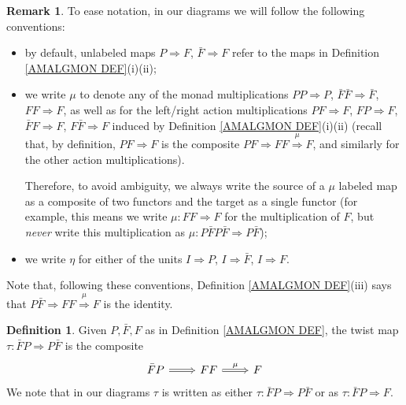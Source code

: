 \documentclass[a4paper,10pt
,draft
]{article}%
\numberwithin{equation}{section}
\numberwithin{figure}{section}
\theoremstyle{definition} %
\newtheorem{definition}[equation]{Definition}%
\newtheorem{remark}[equation]{Remark}%
\newcommand{\1}{\ensuremath{\mathbbm 1}}%
\begin{document}
\begin{remark}\label{SHORTCONV REM}
To ease notation, in our diagrams we will follow the following conventions:
\begin{itemize}
\item by default, unlabeled maps
$P \Rightarrow F$, $\bar{F} \Rightarrow F$ refer to the maps in
Definition \ref{AMALGMON DEF}(i)(ii);
\item we write $\mu$ to denote any of the monad multiplications
$PP \Rightarrow P$,
$\bar{F}\bar{F} \Rightarrow \bar{F}$,
$FF \Rightarrow F$,
as well as for the left/right action multiplications
$PF \Rightarrow F$,
$FP \Rightarrow F$,
$\bar{F} F \Rightarrow F$,
$F \bar{F} \Rightarrow F$
induced by Definition \ref{AMALGMON DEF}(i)(ii)
(recall that, by definition,
$PF \Rightarrow F$ is the composite
$PF \Rightarrow FF \overset{\mu}{\Rightarrow} F$,
and similarly for the other action multiplications).

Therefore, to avoid ambiguity, we always write the 
source of a $\mu$ labeled map as a composite of two functors and the target as a single functor
(for example, this means we write 
$\mu\colon FF \Rightarrow F$ for the multiplication of $F$,
but \emph{never} write this multiplication as $\mu \colon P \bar{F} P \bar{F} \Rightarrow P \bar{F}$);
\item we write $\eta$ for either of the units 
$I \Rightarrow P$,
$I \Rightarrow \bar{F}$,
$I \Rightarrow F$.
\end{itemize}
Note that, following these conventions, 
Definition \ref{AMALGMON DEF}(iii)
says that 
$P\bar{F} \Rightarrow FF \overset{\mu}{\Rightarrow} F$
is the identity.
\end{remark}


\begin{definition}\label{TWISTMAP DEF}
Given $P,\bar{F},F$ as in Definition \ref{AMALGMON DEF}, 
the twist map $\tau \colon \bar{F} P \Rightarrow P \bar{F}$ is the composite
\[
\begin{tikzcd}
	\bar{F} P \ar[Rightarrow]{r}{}
&
	FF  \ar[Rightarrow]{r}{\mu}
&
	F 
\end{tikzcd}
\]
We note that in our diagrams $\tau$ is written as either
$\tau \colon \bar{F} P \Rightarrow P \bar{F}$ or as
$\tau \colon \bar{F} P \Rightarrow F$.
\end{definition}
\end{document}
